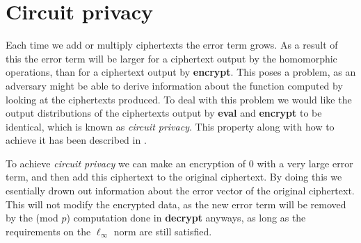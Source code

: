 \documentclass[../main.tex]{subfiles}
\begin{document}
\section{Circuit privacy}
Each time we add or multiply ciphertexts the error term grows.
As a result of this the error term will be larger for a ciphertext output by the homomorphic operations, than for a ciphertext output by \textbf{encrypt}.
This poses a problem, as an adversary might be able to derive information about the function computed by looking at the ciphertexts produced.
To deal with this problem we would like the output distributions of the ciphertexts output by \textbf{eval} and \textbf{encrypt} to be identical, which is known as \textit{circuit privacy}.
This property along with how to achieve it has been described in \cite{gentry2009fully}.

To achieve \textit{circuit privacy} we can make an encryption of $0$ with a very large error term, and then add this ciphertext to the original ciphertext.
By doing this we esentially drown out information about the error vector of the original ciphertext.
This will not modify the encrypted data, as the new error term will be removed by the (mod $p$) computation done in \textbf{decrypt} anyways, as long as the requirements on the $\ell_\infty$ norm are still satisfied.
\end{document}
